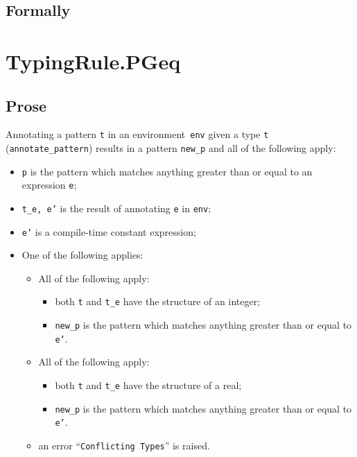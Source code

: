 \documentclass{book}
\begin{document}
\begin{emptyformal}
    \subsection{Formally}
\end{emptyformal}


\section{TypingRule.PGeq \label{sec:TypingRule.PGeq}}

  \subsection{Prose}
   Annotating a pattern \texttt{t} in an environment~\texttt{env} given a type \texttt{t} (\texttt{annotate\_pattern}) results in a pattern \texttt{new\_p} and all of the following apply:
   \begin{itemize}
   \item \texttt{p} is the pattern which matches anything greater than or equal to an expression \texttt{e};
   \item \texttt{t\_e, e'} is the result of annotating \texttt{e} in \texttt{env}; 
   \item \texttt{e'} is a compile-time constant expression;
   \item One of the following applies:
     \begin{itemize}
     \item All of the following apply:
           \begin{itemize}
           \item both \texttt{t} and \texttt{t\_e} have the structure of an integer;
           \item \texttt{new\_p} is the pattern which matches anything greater than or equal to \texttt{e'}.
           \end{itemize}
     \item All of the following apply:
           \begin{itemize}
           \item both \texttt{t} and \texttt{t\_e} have the structure of a real;
           \item \texttt{new\_p} is the pattern which matches anything greater than or equal to \texttt{e'}.
           \end{itemize} 
     \item an error ``\texttt{Conflicting Types}'' is raised.
     \end{itemize}
   \end{itemize}
\end{document}
